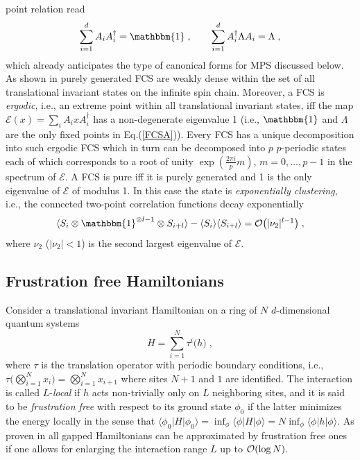 \documentclass[aps,prl,epsfig,graphics,floatfix,mathbbm,a4paper]{article}
\newcommand{\E}{\mathcal{E}}
\newcommand{\1}{\mathbbm{1}}
\renewcommand{\>}{\rangle}
\newcommand{\<}{\langle}
\begin{document}
point relation  read \begin{equation}\label{FCSA} \sum_{i=1}^d
    A_iA_i^\dag=\mathbbm{1}\;,\qquad \sum_{i=1}^d A_i^\dag\Lambda A_i
    =\Lambda\;,
\end{equation} which already anticipates the type of canonical forms for
MPS discussed below. As shown in \cite{FaNaWe92-2} purely
generated FCS are weakly dense within the set of all translational
invariant states on the infinite spin chain. Moreover, a FCS is
\emph{ergodic}, i.e., an extreme point within all translational
invariant states, iff the map $\E(x)=\sum_iA_ixA_i^\dag$ has a
non-degenerate eigenvalue 1 (i.e., $\mathbbm{1}$ and $\Lambda$ are
the only fixed points in Eq.(\ref{FCSA})). Every FCS has a unique
decomposition into such ergodic FCS which in turn can be
decomposed into $p$ $p$-periodic states each of which corresponds
to a root of unity $\exp(\frac{2\pi i}p m)$, $m=0,\ldots,p-1$ in
the spectrum of $\E$. A FCS is pure iff it is purely generated and
1 is the only eigenvalue of $\E$ of modulus 1. In this case the
state is \emph{exponentially clustering}, i.e., the connected
two-point correlation functions decay exponentially
\begin{equation}\label{eq:corr}
    \langle S_i\otimes\mathbbm{1}^{\otimes l-1}\otimes
    S_{i+l}\rangle-\langle S_i\rangle\langle S_{i+l}\rangle={\cal
    O}\big(|\nu_2|^{l-1}\big)\;,
\end{equation} where $\nu_2$ ($|\nu_2|<1$) is the second largest eigenvalue of
$\E$.

\newpage\subsection{Frustration free Hamiltonians} Consider a
translational invariant Hamiltonian on a ring of $N$
$d$-dimensional quantum systems
\begin{equation}H=\sum_{i=1}^N \tau^i\big(h\big)\;,
\end{equation}
where $\tau$ is the translation operator with periodic boundary
conditions, i.e., $\tau\big(\bigotimes_{i=1}^N
    x_i\big)=\bigotimes_{i=1}^N x_{i+1}$ where sites $N+1$ and $1$ are
identified. The interaction is called $L$-\emph{local} if $h$ acts
non-trivially only on $L$ neighboring sites, and it is said to be
\emph{frustration free} with respect to its ground state $\phi_0$
if the latter minimizes the energy locally in the sense that
$\langle \phi_0|H|\phi_0\rangle=\inf_\phi \langle
    \phi|H|\phi\rangle=N \inf_\phi \langle \phi|h|\phi\rangle$. As
proven in \cite{Hast1} all gapped Hamiltonians can be approximated
by frustration free ones if one allows for enlarging the
interaction range $L$ up to ${\cal O}(\log N)$.
\end{document}
